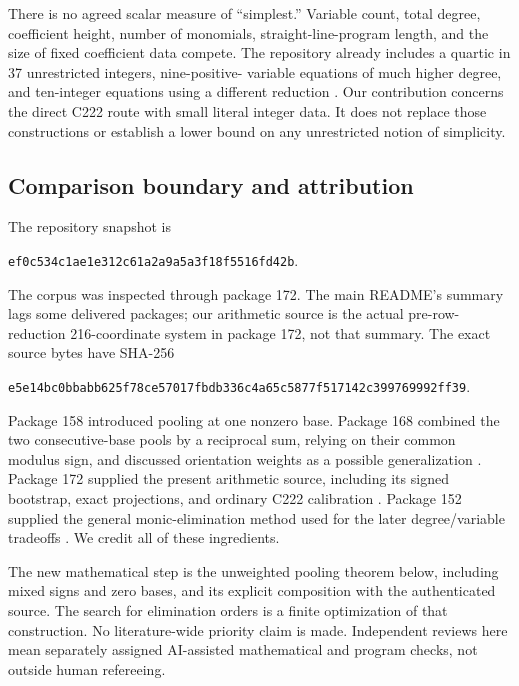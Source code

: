 \documentclass[10pt,letterpaper]{article}
\theoremstyle{remark}\newtheorem{remark}[theorem]{Remark}
\begin{document}
There is no agreed scalar measure of ``simplest.'' Variable count, total
degree, coefficient height, number of monomials, straight-line-program
length, and the size of fixed coefficient data compete. The repository
already includes a quartic in 37 unrestricted integers, nine-positive-
variable equations of much higher degree, and ten-integer equations
using a different reduction \cite{corpus}. Our contribution concerns the
direct C222 route with small literal integer data. It does not replace
those constructions or establish a lower bound on any unrestricted
notion of simplicity.

\subsection{Comparison boundary and attribution}

The repository snapshot is
\begin{center}\small\texttt{ef0c534c1ae1e312c61a2a9a5a3f18f5516fd42b}.\end{center}
The corpus was inspected through package 172. The main README's summary
lags some delivered packages; our arithmetic source is the actual
pre-row-reduction 216-coordinate system in package 172, not that summary.
The exact source bytes have SHA-256
\begin{center}\scriptsize\texttt{e5e14bc0bbabb625f78ce57017fbdb336c4a65c5877f517142c399769992ff39}.\end{center}

Package 158 introduced pooling at one nonzero base. Package 168 combined
the two consecutive-base pools by a reciprocal sum, relying on their
common modulus sign, and discussed orientation weights as a possible
generalization \cite{pool158,pool168}. Package 172 supplied the present
arithmetic source, including its signed bootstrap, exact projections,
and ordinary C222 calibration \cite{source172}. Package 152 supplied the
general monic-elimination method used for the later degree/variable
tradeoffs \cite{eliminate152}. We credit all of these ingredients.

The new mathematical step is the unweighted pooling theorem below,
including mixed signs and zero bases, and its explicit composition with
the authenticated source. The search for elimination orders is a finite
optimization of that construction. No literature-wide priority claim is
made. Independent reviews here mean separately assigned AI-assisted
mathematical and program checks, not outside human refereeing.
\end{document}
